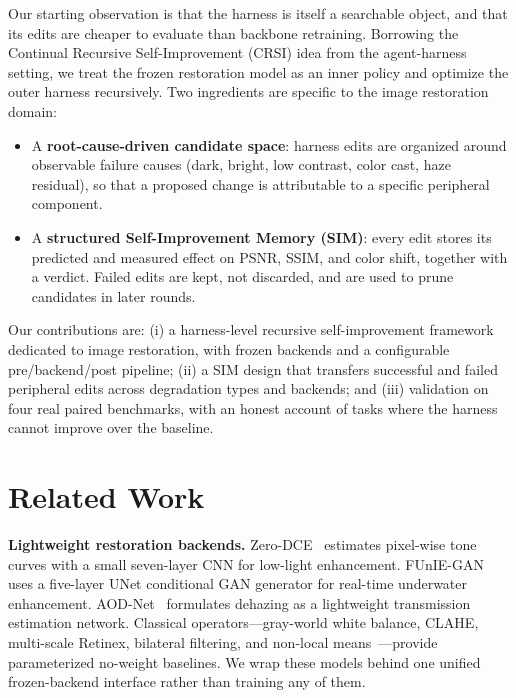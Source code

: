 \documentclass[11pt,letterpaper]{article}
\begin{document}
Our starting observation is that the harness is itself a searchable object, and that its
edits are cheaper to evaluate than backbone retraining. Borrowing the Continual Recursive
Self-Improvement (CRSI) idea from the agent-harness setting, we treat the frozen restoration
model as an inner policy and optimize the outer harness recursively. Two ingredients are
specific to the image restoration domain:

\begin{itemize}[leftmargin=*]
  \item A \textbf{root-cause-driven candidate space}: harness edits are organized around
        observable failure causes (dark, bright, low contrast, color cast, haze residual),
        so that a proposed change is attributable to a specific peripheral component.
  \item A \textbf{structured Self-Improvement Memory (SIM)}: every edit stores its predicted
        and measured effect on PSNR, SSIM, and color shift, together with a verdict. Failed
        edits are kept, not discarded, and are used to prune candidates in later rounds.
\end{itemize}

Our contributions are: (i) a harness-level recursive self-improvement framework dedicated to
image restoration, with frozen backends and a configurable pre/backend/post pipeline;
(ii) a SIM design that transfers successful and failed peripheral edits across degradation
types and backends; and (iii) validation on four real paired benchmarks, with an honest
account of tasks where the harness cannot improve over the baseline.

\section{Related Work}
\label{sec:related}

\textbf{Lightweight restoration backends.} Zero-DCE~\cite{guo2021zerodce} estimates pixel-wise
tone curves with a small seven-layer CNN for low-light enhancement. FUnIE-GAN~\cite{islam2020funie}
uses a five-layer UNet conditional GAN generator for real-time underwater enhancement.
AOD-Net~\cite{li2017aodnet} formulates dehazing as a lightweight transmission estimation
network. Classical operators---gray-world white balance, CLAHE, multi-scale Retinex, bilateral
filtering, and non-local means~\cite{buades2005nlm}---provide parameterized no-weight baselines.
We wrap these models behind one unified frozen-backend interface rather than training any of
them.
\end{document}
